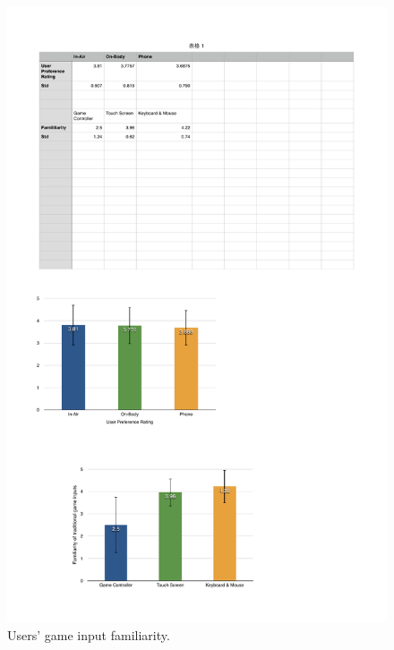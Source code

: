 \documentclass{sigchi}
\begin{document}
  \begin{figure}[!h]
  \centering
  \includegraphics[width=1\columnwidth]{Familiarity.pdf}
  \caption{Users' game input familiarity.}
  \label{fig:figureFamiliarity}
  \end{figure}  
\end{document}
